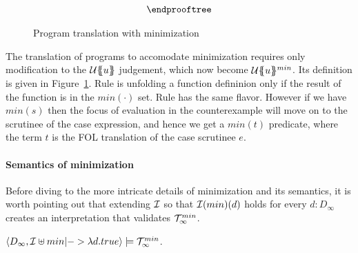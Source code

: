 \begin{figure}
\[\begin{array}{c}
{\begin{array}{l}
  \end{array}}
\endprooftree
\end{array}\]
\caption{Program translation with minimization}\label{fig:min-def-trans-min}
\end{figure}

The translation of programs to accomodate minimization requires only modification 
to the ${\cal U}\{\!\!\{u\}\!\!\}$ judgement, which now become ${\cal U}\{\!\!\{u\}\!\!\}^{min}$. Its definition
is given in Figure~\ref{fig:min-def-trans-min}. Rule  is unfolding a function
defininion only if the result of the function is in the $min(\cdot)$ set. Rule 
has the same flavor. However if we have $min(s)$ then the focus of evaluation in the counterexample
will move on to the scrutinee of the case expression, and hence we get a $min(t)$ predicate, where the 
term $t$ is the FOL translation of the case scrutinee $e$.

\paragraph{Semantics of minimization}
\newcommand{\ThMin}{\Th_{\infty}^{min}}
\newcommand{\SDownarrow}{\downarrow}

Before diving to the more intricate details of minimization and its semantics, it is worth pointing out that 
extending ${\cal I}$ so that ${\cal I}(min)(d)$ holds for every $d : D_\infty$ creates an interpretation that 
validates $\ThMin$. 
\begin{theorem} $\langle D_\infty, {\cal I}\uplus min |-> \lambda d.true\rangle \models \ThMin$. \end{theorem} 

